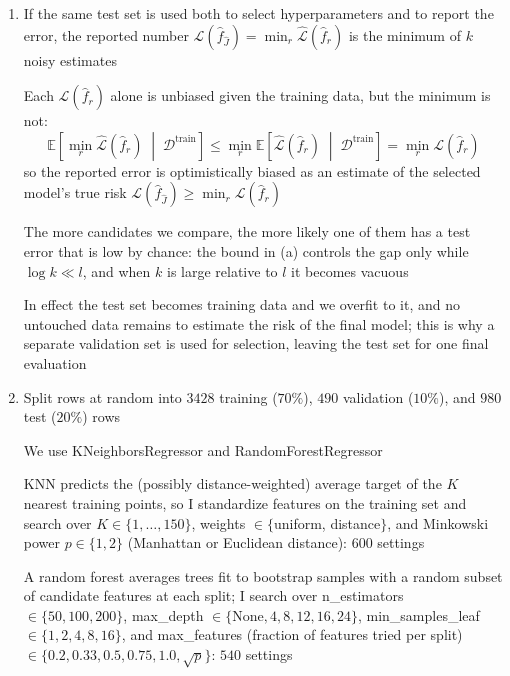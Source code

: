 \documentclass{article}
\begin{document}
\begin{enumerate}[label=\alph*.]
The bound depends on the test-set size $l$ and on the number of candidate settings $k$ only through $\log k$, and does not depend on $n$; $n$ affects only how good the candidates $\hat f_r$ are

\item If the same test set is used both to select hyperparameters and to report the error, the reported number $\hat{\mathcal L}(\hat f_{\hat J})=\min_r\hat{\mathcal L}(\hat f_r)$ is the minimum of $k$ noisy estimates

Each $\hat{\mathcal L}(\hat f_r)$ alone is unbiased given the training data, but the minimum is not:
\[\mathbb E\left[\min_r\hat{\mathcal L}(\hat f_r)\;\middle|\;\mathcal D^{\mathrm{train}}\right]\leq\min_r\mathbb E\left[\hat{\mathcal L}(\hat f_r)\;\middle|\;\mathcal D^{\mathrm{train}}\right]=\min_r\mathcal L(\hat f_r)\]
so the reported error is optimistically biased as an estimate of the selected model's true risk $\mathcal L(\hat f_{\hat J})\geq\min_r\mathcal L(\hat f_r)$

The more candidates we compare, the more likely one of them has a test error that is low by chance: the bound in (a) controls the gap only while $\log k\ll l$, and when $k$ is large relative to $l$ it becomes vacuous

In effect the test set becomes training data and we overfit to it, and no untouched data remains to estimate the risk of the final model; this is why a separate validation set is used for selection, leaving the test set for one final evaluation

\item Split rows at random into $3428$ training ($70\%$), $490$ validation ($10\%$), and $980$ test ($20\%$) rows

We use KNeighborsRegressor and RandomForestRegressor

KNN predicts the (possibly distance-weighted) average target of the $K$ nearest training points, so I standardize features on the training set and search over $K\in\{1,\ldots,150\}$, weights $\in\{$uniform, distance$\}$, and Minkowski power $p\in\{1,2\}$ (Manhattan or Euclidean distance): $600$ settings

A random forest averages trees fit to bootstrap samples with a random subset of candidate features at each split; I search over n\_estimators $\in\{50,100,200\}$, max\_depth $\in\{\text{None},4,8,12,16,24\}$, min\_samples\_leaf $\in\{1,2,4,8,16\}$, and max\_features (fraction of features tried per split) $\in\{0.2,0.33,0.5,0.75,1.0,\sqrt p\}$: $540$ settings


\end{enumerate}
\end{document}
